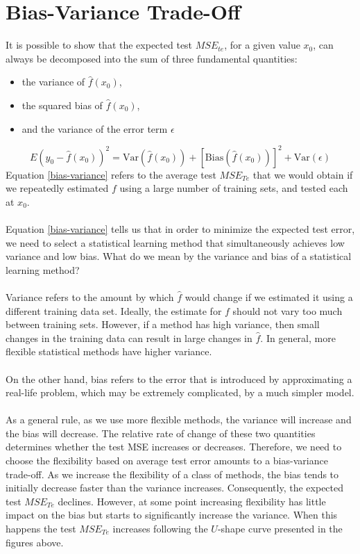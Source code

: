 \section{Bias-Variance Trade-Off}
It is possible to show that the expected test $MSE_{te}$, for a given value $x_0$, can always be decomposed into the sum of three fundamental quantities:
\begin{itemize}
    \item the variance of $\hat{f}(x_0)$,
    \item the squared bias of $\hat{f}(x_0)$,
    \item and the variance of the error term $\epsilon$
\end{itemize}
\begin{equation}
    E(y_0 - \hat{f}(x_0))^2 = \text{Var}(\hat{f}(x_0)) + [\text{Bias}(\hat{f}(x_0))]^2 + \text{Var}(\epsilon)
    \label{bias-variance}
\end{equation}
Equation \ref{bias-variance} refers to the average test $MSE_{Te}$ that we would obtain if we repeatedly estimated $f$ using a large number of training sets, and tested each at $x_0$.\\\\
Equation \ref{bias-variance}  tells us that in order to minimize the expected test error, we need to select a statistical learning method that simultaneously achieves low variance and low bias. What do we mean by the variance and bias of a statistical learning method?\\\\
Variance refers to the amount by which $\hat{f}$ would change if we estimated it using a different training data set. Ideally, the estimate for $f$ should not vary too much between training sets. However, if a method has high variance, then small changes in the training data can result in large changes in $\hat{f}$. In general, more flexible statistical methods have higher variance.\\\\
On the other hand, bias refers to the error that is introduced by approximating a real-life problem, which may be extremely complicated, by a much simpler model.\\\\
As a general rule, as we use more flexible methods, the variance will increase and the bias will decrease. The relative rate of change of these two quantities determines whether the test MSE increases or decreases. Therefore, we need to choose the flexibility based on average test error amounts to a bias-variance trade-off. As we increase the flexibility of a class of methods, the bias tends to initially decrease faster than the variance increases. Consequently, the expected test $MSE_{Te}$ declines. However, at some point increasing flexibility has little impact on the bias but starts to significantly increase the variance. When this happens the test $MSE_{Te}$ increases following the $U$-shape curve presented in the figures above.
